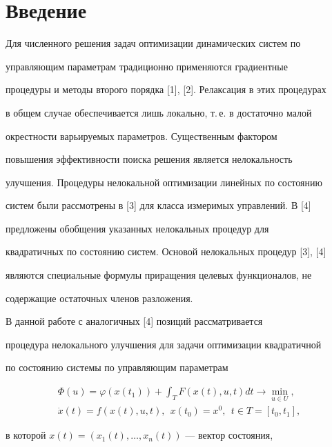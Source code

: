 \label{begin} 


 


\section{Введение} 


 


Для численного решения задач оптимизации динамических систем по 


управляющим параметрам традиционно применяются градиентные 


процедуры и методы второго порядка [1], [2]. Релаксация в этих процедурах 


в общем случае обеспечивается лишь локально, т.\,е. в достаточно малой 


окрестности варьируемых параметров. Существенным фактором 


повышения эффективности поиска решения является нелокальность 


улучшения. Процедуры нелокальной оптимизации линейных по состоянию 


систем были рассмотрены в [3] для класса измеримых управлений. В [4] 


предложены обобщения указанных нелокальных процедур для 


квадратичных по состоянию систем. Основой нелокальных процедур [3], [4] 


являются специальные формулы приращения целевых функционалов, не 


содержащие остаточных членов разложения. 


 


В данной работе с аналогичных [4] позиций рассматривается 


процедура нелокального улучшения для задачи оптимизации квадратичной 


по состоянию системы по управляющим параметрам 


\begin{gather} 


\Phi(u)=\varphi(x(t_1))+\int_T F(x(t),u,t)d t\to\min_{u\in U},\\ 


% 


\Dot x(t)=f(x(t),u,t),\ \ x(t_0)=x^0,\ \ t\in T=[t_0,t_1], 


\end{gather} 


в которой $x(t)=(x_1(t),\dotsc,x_n(t))$ --- вектор состояния, 


